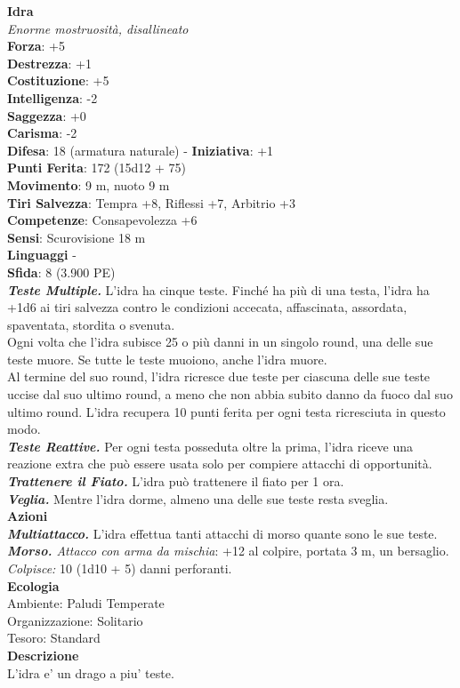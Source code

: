 \begin{multicols}{2}
\medskip\textbf{Idra}\\
\emph{Enorme mostruosità, disallineato}\\
\textbf{Forza}: +5\\
\textbf{Destrezza}: +1\\
\textbf{Costituzione}: +5\\
\textbf{Intelligenza}: -2\\
\textbf{Saggezza}: +0\\
\textbf{Carisma}: -2\\
\textbf{Difesa}: 18 (armatura naturale) - \textbf{Iniziativa}: +1\\
\textbf{Punti Ferita}: 172 (15d12 + 75)\\
\textbf{Movimento}: 9 m, nuoto 9 m\\
\textbf{Tiri Salvezza}: Tempra +8, Riflessi +7, Arbitrio +3\\
\textbf{Competenze}: Consapevolezza +6\\
\textbf{Sensi}: Scurovisione 18 m\\
\textbf{Linguaggi} -\\
\textbf{Sfida}: 8 (3.900 PE)\smallskip\\
\emph{\textbf{Teste Multiple.}} L'idra ha cinque teste. Finché ha più di una testa, l'idra ha +1d6 ai tiri salvezza contro le condizioni accecata, affascinata, assordata, spaventata, stordita o svenuta.\\
Ogni volta che l'idra subisce 25 o più danni in un singolo round, una delle sue teste muore. Se tutte le teste muoiono, anche l'idra muore.\\
Al termine del suo round, l'idra ricresce due teste per ciascuna delle sue teste uccise dal suo ultimo round, a meno che non abbia subito danno da fuoco dal suo ultimo round. L'idra recupera 10 punti ferita per ogni testa ricresciuta in questo modo.\\
\emph{\textbf{Teste Reattive.}} Per ogni testa posseduta oltre la prima, l'idra riceve una reazione extra che può essere usata solo per compiere attacchi di opportunità.\\
\emph{\textbf{Trattenere il Fiato.}} L'idra può trattenere il fiato per 1 ora.\\
\emph{\textbf{Veglia.}} Mentre l'idra dorme, almeno una delle sue teste resta sveglia.\\
\smallskip\textbf{Azioni}\\
\emph{\textbf{Multiattacco.}} L'idra effettua tanti attacchi di morso quante sono le sue teste.\\
\emph{\textbf{Morso.} Attacco con arma da mischia}: +12 al colpire, portata 3 m, un bersaglio.\\
\emph{Colpisce:} 10 (1d10 + 5) danni perforanti. \\
\textbf{Ecologia}\\
Ambiente: Paludi Temperate\\
Organizzazione: Solitario\\
Tesoro: Standard\\
\textbf{Descrizione}\\
L'idra e' un drago a piu' teste.\\


\end{multicols}
